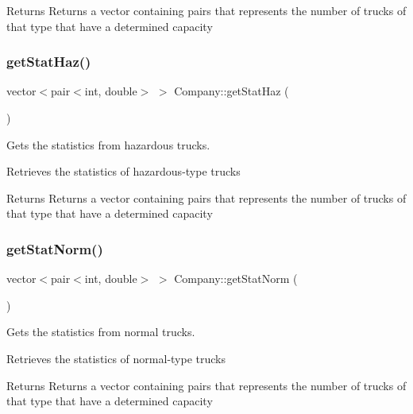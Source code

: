 \begin{DoxyReturn}{Returns}
Returns a vector containing pairs that represents the number of trucks of that type that have a determined capacity 
\end{DoxyReturn}
\mbox{\label{class_company_aa37fd8b5214cc269f8f1a0d9b23d2c61}} 
\subsubsection{\texorpdfstring{get\+Stat\+Haz()}{getStatHaz()}}
{\footnotesize\ttfamily vector$<$pair$<$int, double$>$ $>$ Company\+::get\+Stat\+Haz (\begin{DoxyParamCaption}{ }\end{DoxyParamCaption})\hspace{0.3cm}{\ttfamily [inline]}}



Gets the statistics from hazardous trucks. 

Retrieves the statistics of hazardous-\/type trucks

\begin{DoxyReturn}{Returns}
Returns a vector containing pairs that represents the number of trucks of that type that have a determined capacity 
\end{DoxyReturn}
\mbox{\label{class_company_aec149faa3a58555957f83df920897253}} 
\subsubsection{\texorpdfstring{get\+Stat\+Norm()}{getStatNorm()}}
{\footnotesize\ttfamily vector$<$pair$<$int, double$>$ $>$ Company\+::get\+Stat\+Norm (\begin{DoxyParamCaption}{ }\end{DoxyParamCaption})\hspace{0.3cm}{\ttfamily [inline]}}



Gets the statistics from normal trucks. 

Retrieves the statistics of normal-\/type trucks

\begin{DoxyReturn}{Returns}
Returns a vector containing pairs that represents the number of trucks of that type that have a determined capacity 
\end{DoxyReturn}
\mbox{\label{class_company_acb9c7285e4ca619899017bd1221a1d27}} 
